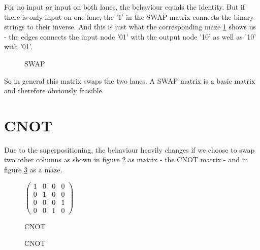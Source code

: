\documentclass[oneside]{thesisclass}
\begin{document}
For no input or input on both lanes, the behaviour equals the identity.
But if there is only input on one lane, the '1' in the SWAP matrix connects the binary strings to their inverse.
And this is just what the corresponding maze \ref{swapM} shows us - the edges connects the input node '01' with the output node '10' as well as '10' with '01'.
\begin{figure}
\begin{center}
   \caption{SWAP}
   \label{swapM}
   \end{center}
\end{figure}

So in general this matrix swaps the two lanes.
A SWAP matrix is a basic matrix and therefore obviously feasible.\\

\section{CNOT}
Due to the superpositioning, the behaviour heavily changes if we choose to swap two other columns as shown in figure \ref{cnot} as matrix - the CNOT matrix - and in figure \ref{cnotM} as a maze.
\begin{figure}
\begin{center}
 $
 \begin{pmatrix}
  1 & 0 & 0 & 0 \\
  0 & 1 & 0 & 0 \\
  0 & 0 & 0 & 1 \\
  0 & 0 & 1 & 0
  \end{pmatrix}
 $
  \caption{CNOT}
  \label{cnot}
  \end{center}
\end{figure}
\begin{figure}
\begin{center}
   \caption{CNOT}
   \label{cnotM}
   \end{center}
\end{figure}
\end{document}

